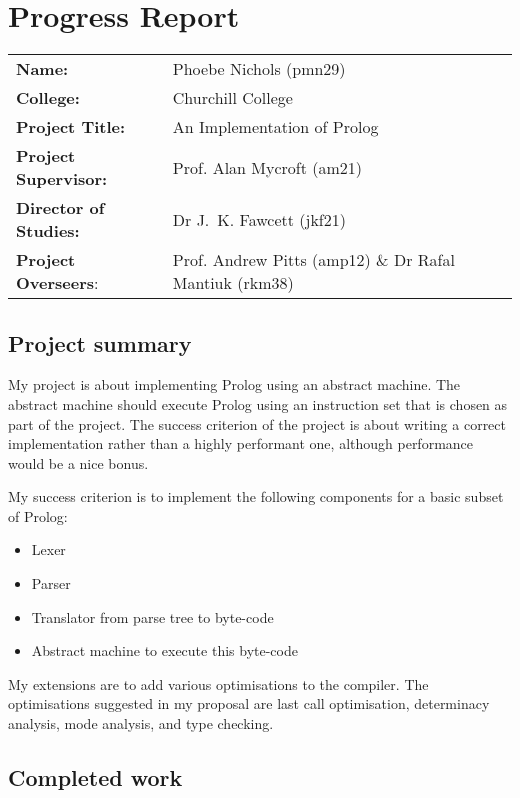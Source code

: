 \documentclass[12pt,a4paper]{report}
\begin{document}
\chapter*{Progress Report}

\begingroup
\renewcommand*{\arraystretch}{1.5}
\begin{tabular}{@{} l l @{}}
  \textbf{Name:}                & Phoebe Nichols (pmn29) \\
  \textbf{College:}             & Churchill College \\
  \textbf{Project Title:}       & An Implementation of Prolog \\
  \textbf{Project Supervisor:}  & Prof. Alan Mycroft (am21)\\
  \textbf{Director of Studies:} & Dr J.~K. Fawcett (jkf21) \\
  \textbf{Project Overseers}:   & Prof. Andrew Pitts (amp12) \& Dr Rafal Mantiuk (rkm38) \\
\end{tabular}
\endgroup

\section*{Project summary}
My project is about implementing Prolog using an abstract machine. The abstract machine should execute Prolog using an instruction set that is chosen as part of the project. The success criterion of the project is about writing a correct implementation rather than a highly performant one, although performance would be a nice bonus.

My success criterion is to implement the following components for a basic subset of Prolog:
\begin{itemize}
\item Lexer
\item Parser
\item Translator from parse tree to byte-code
\item Abstract machine to execute this byte-code
\end{itemize}
My extensions are to add various optimisations to the compiler. The optimisations suggested in my proposal are last call optimisation, determinacy analysis, mode analysis, and type checking.

\section*{Completed work}
\end{document}
